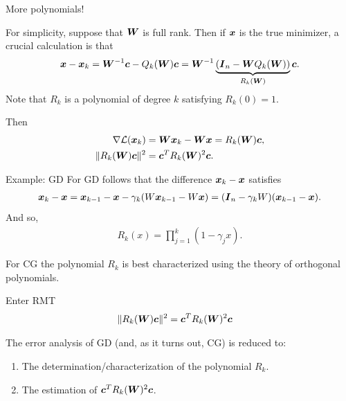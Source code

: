 \documentclass[9pt,aspectratio=169]{beamer}
\begin{document}
\begin{frame}{More polynomials!}


For simplicity, suppose that ${\boldsymbol W}$ is full rank.  Then if ${\boldsymbol x}$ is the true minimizer, a crucial calculation is that
\begin{align*}
    {\boldsymbol x} - {\boldsymbol x}_k = {\boldsymbol W}^{-1} {\boldsymbol c} - Q_k({\boldsymbol W}){\boldsymbol c} = {\boldsymbol W}^{-1} \underbrace{({\boldsymbol I}_n - {\boldsymbol W} Q_k({\boldsymbol W}))}_{R_k({\boldsymbol W})} {\boldsymbol c}.
\end{align*}
Note that $R_k$ is a polynomial of degree $k$ satisfying $R_k(0) = 1$.

\vspace{.1in}

Then
\begin{align*}
    \nabla \mathcal L({\boldsymbol x}_k) &= {\boldsymbol W} {\boldsymbol x}_k - {\boldsymbol W} {\boldsymbol x} = R_k({\boldsymbol W}) {\boldsymbol c},\\
    \|R_k({\boldsymbol W}) {\boldsymbol c}\|^2 &= {\boldsymbol c}^T R_k({\boldsymbol W})^2 {\boldsymbol c}.
\end{align*}

\end{frame}

\begin{frame}{Example: GD}
For GD follows that the difference ${\boldsymbol x}_k - {\boldsymbol x}$ satisfies
\begin{align*}
{\boldsymbol x}_k - {\boldsymbol x} = {\boldsymbol x}_{k-1} - {\boldsymbol x} - \gamma_k (W {\boldsymbol x}_{k-1} - W {\boldsymbol x}) = ({\boldsymbol I}_n - \gamma_k W) ({\boldsymbol x}_{k-1} - {\boldsymbol x}).
\end{align*}
And so,
\begin{align*}
    R_k(x) = \prod_{j=1}^k (1 - \gamma_j x).
\end{align*}
\pause

For CG the polynomial $R_k$ is best characterized using the theory of orthogonal polynomials.


\end{frame}


\begin{frame}{Enter RMT}
\begin{align*}
    \|R_k({\boldsymbol W}) {\boldsymbol c}\|^2 &= {\boldsymbol c}^T R_k({\boldsymbol W})^2 {\boldsymbol c}
\end{align*}

The error analysis of GD (and, as it turns out, CG) is reduced to:
\begin{enumerate}
    \item The determination/characterization of the polynomial $R_k$.
    \item The estimation of ${\boldsymbol c}^T R_k({\boldsymbol W})^2 {\boldsymbol c}$.
\end{enumerate}
\end{frame}
\end{document}
